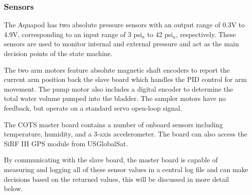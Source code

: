 \subsubsection{Sensors} The Aquapod has two absolute pressure sensors with an
output range of 0.3V to 4.9V, corresponding to an input range of 3 psi\(_a\) to
42 psi\(_a\), respectively. These sensors are used to monitor internal and
external pressure and act as the main decision points of the state machine.

The two arm motors feature absolute magnetic shaft encoders to report the
current arm position back the slave board which handles the PID control for arm
movement. The pump motor also includes a digital encoder to determine the total
water volume pumped into the bladder. The sampler motors have no feedback, but
operate on a standard servo open-loop signal.

The COTS master board contains a number of onboard sensors including
temperature, humidity, and a 3-axis accelerometer. The board can also access the
SiRF III GPS module from USGlobalSat.

By communicating with the slave board, the master board is capable of measuring
and logging all of these sensor values in a central log file and can make
decisions based on the returned values, this will be discussed in more detail
below.

